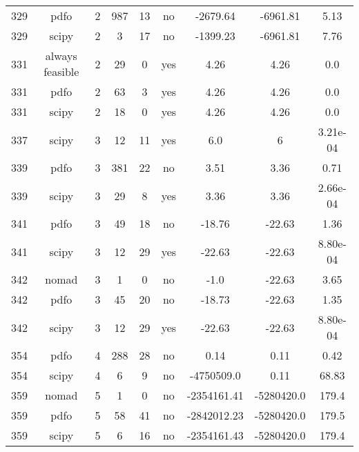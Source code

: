 \begin{scriptsize}
\begin{center}
\begin{longtable}{ccccccccc}
329 &            pdfo &  2 &    987 &     13 &      no &    -2679.64 &    -6961.81 &     5.13\\
329 &           scipy &  2 &      3 &     17 &      no &    -1399.23 &    -6961.81 &     7.76\\
331 & always feasible &  2 &     29 &      0 &     yes &        4.26 &        4.26 &      0.0\\
331 &            pdfo &  2 &     63 &      3 &     yes &        4.26 &        4.26 &      0.0\\
331 &           scipy &  2 &     18 &      0 &     yes &        4.26 &        4.26 &      0.0\\
337 &           scipy &  3 &     12 &     11 &     yes &         6.0 &           6 & 3.21e-04\\
339 &            pdfo &  3 &    381 &     22 &      no &        3.51 &        3.36 &     0.71\\
339 &           scipy &  3 &     29 &      8 &     yes &        3.36 &        3.36 & 2.66e-04\\
341 &            pdfo &  3 &     49 &     18 &      no &      -18.76 &      -22.63 &     1.36\\
341 &           scipy &  3 &     12 &     29 &     yes &      -22.63 &      -22.63 & 8.80e-04\\
342 &           nomad &  3 &      1 &      0 &      no &        -1.0 &      -22.63 &     3.65\\
342 &            pdfo &  3 &     45 &     20 &      no &      -18.73 &      -22.63 &     1.35\\
342 &           scipy &  3 &     12 &     29 &     yes &      -22.63 &      -22.63 & 8.80e-04\\
354 &            pdfo &  4 &    288 &     28 &      no &        0.14 &        0.11 &     0.42\\
354 &           scipy &  4 &      6 &      9 &      no &  -4750509.0 &        0.11 &    68.83\\
359 &           nomad &  5 &      1 &      0 &      no & -2354161.41 &  -5280420.0 &    179.4\\
359 &            pdfo &  5 &     58 &     41 &      no & -2842012.23 &  -5280420.0 &    179.5\\
359 &           scipy &  5 &      6 &     16 &      no & -2354161.43 &  -5280420.0 &    179.4
\end{longtable}
\end{center}
\end{scriptsize}
